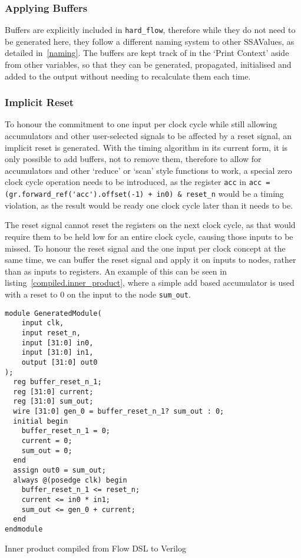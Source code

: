 \subsubsection{Applying Buffers}
Buffers are explicitly included in \lstinline|hard_flow|, therefore while they do not need to be generated here, they follow a different naming system to other SSAValues, as detailed in \ref{naming}. The buffers are kept track of in the `Print Context' aside from other variables, so that they can be generated, propagated, initialised and added to the output without needing to recalculate them each time.

\subsubsection{Implicit Reset}\label{reset.implicit}
To honour the commitment to one input per clock cycle while still allowing accumulators and other user-selected signals to be affected by a reset signal, an implicit reset is generated. With the timing algorithm in its current form, it is only possible to add buffers, not to remove them, therefore to allow for accumulators and other `reduce' or `scan' style functions to work, a special zero clock cycle operation needs to be introduced, as the register \lstinline|acc| in \lstinline|acc = (gr.forward_ref('acc').offset(-1) + in0) & reset_n| would be a timing violation, as the result would be ready one clock cycle later than it needs to be.

The reset signal cannot reset the registers on the next clock cycle, as that would require them to be held low for an entire clock cycle, causing those inputs to be missed. To honour the reset signal and the one input per clock concept at the same time, we can buffer the reset signal and apply it on inputs to nodes, rather than as inputs to registers. An example of this can be seen in listing \ref{compiled.inner_product}, where a simple add based accumulator is used with a reset to 0 on the input to the node \lstinline|sum_out|.

\renewcommand\theFancyVerbLine{\arabic{FancyVerbLine}}
\begin{listing}[H]
  \begin{verbatim}
module GeneratedModule(
    input clk,
    input reset_n,
    input [31:0] in0,
    input [31:0] in1,
    output [31:0] out0
);
  reg buffer_reset_n_1;
  reg [31:0] current;
  reg [31:0] sum_out;
  wire [31:0] gen_0 = buffer_reset_n_1? sum_out : 0;
  initial begin
    buffer_reset_n_1 = 0;
    current = 0;
    sum_out = 0;
  end
  assign out0 = sum_out;
  always @(posedge clk) begin
    buffer_reset_n_1 <= reset_n;
    current <= in0 * in1;
    sum_out <= gen_0 + current;
  end
endmodule
\end{verbatim}
  \caption{Inner product compiled from Flow DSL to Verilog}\label{compiled.inner_product}
\end{listing}

